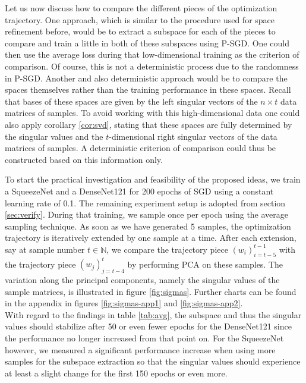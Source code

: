 \documentclass[11pt, a4paper]{article}
\newcommand{\N}{\mathbb{N}}
\begin{document}
Let us now discuss how to compare the different pieces of the optimization trajectory. One approach, which is similar to the procedure used for space refinement before, would be to extract a subspace for each of the pieces to compare and train a little in both of these subspaces using P-SGD. One could then use the average loss during that low-dimensional training as the criterion of comparison. Of course, this is not a deterministic process due to the randomness in P-SGD. Another and also deterministic approach would be to compare the spaces themselves rather than the training performance in these spaces. Recall that bases of these spaces are given by the left singular vectors of the $n \times t$ data matrices of samples. To avoid working with this high-dimensional data one could also apply corollary \ref{cor:svd}, stating that these spaces are fully determined by the singular values and the $t$-dimensional right singular vectors of the data matrices of samples. A deterministic criterion of comparison could thus be constructed based on this information only.

To start the practical investigation and feasibility of the proposed ideas, we train a SqueezeNet and a DenseNet121 for 200 epochs of SGD using a constant learning rate of 0.1. The remaining experiment setup is adopted from section \ref{sec:verify}. During that training, we sample once per epoch using the average sampling technique. As soon as we have generated 5 samples, the optimization trajectory is iteratively extended by one sample at a time. After each extension, say at sample number $t \in \N$, we compare the trajectory piece $(w_i)_{i=t-5}^{t-1}$ with the trajectory piece $(w_j)_{j=t-4}^{t}$ by performing PCA on these samples. The variation along the principal components, namely the singular values of the sample matrices, is illustrated in figure \ref{fig:sigmas}. Further charts can be found in the appendix in figures \ref{fig:sigmas-app1} and \ref{fig:sigmas-app2}. \\

With regard to the findings in table \ref{tab:avg}, the subspace and thus the singular values should stabilize after 50 or even fewer epochs for the DenseNet121 since the performance no longer increased from that point on. For the SqueezeNet however, we measured a significant performance increase when using more samples for the subspace extraction so that the singular values should experience at least a slight change for the first 150 epochs or even more.
\end{document}
